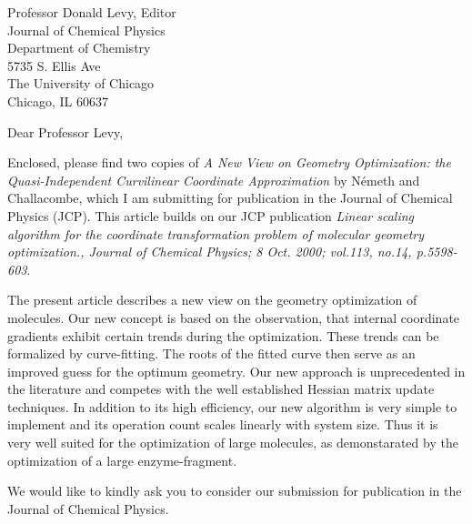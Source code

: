 
\pagestyle{empty}

\signature{K{\'a}roly N{\'e}meth}

\address{
Dr.~K{\'a}roly N{\'e}meth \\
(knemeth@lanl.gov) \\
Theoretical Division \\
Group T-12, MS B268 \\
Los Alamos National Laboratory \\
Los Alamos, NM 87545 }

\begin{letter}{
Professor Donald Levy, Editor\\
Journal of Chemical Physics\\
Department of Chemistry\\
5735 S. Ellis Ave\\
The University of Chicago\\
Chicago, IL 60637}

\opening{Dear Professor Levy,}

Enclosed, please find two copies of 
{\em 
A New View on Geometry Optimization: the Quasi-Independent 
Curvilinear Coordinate Approximation
} by N{\'e}meth and Challacombe,
which I am submitting for publication in the Journal of Chemical Physics (JCP). This 
article builds 
on our JCP publication {\em Linear scaling algorithm for the coordinate transformation problem of molecular geometry optimization., 
Journal of Chemical Physics; 8 Oct. 2000; vol.113, no.14, p.5598-603}.

The present article describes a new view on the geometry optimization
of molecules. Our new concept is based on the observation, that
internal coordinate gradients exhibit certain trends during the 
optimization. These trends can be formalized by curve-fitting. 
The roots of the fitted curve then serve as an improved guess
for the optimum geometry. Our new approach is unprecedented in the 
literature and competes with the well established Hessian matrix update
techniques. In addition to its high efficiency, our new
algorithm is very simple to implement and its operation count scales
linearly with system size. Thus it is very well suited for the
optimization of large molecules, as demonstarated by
the optimization of a large enzyme-fragment.

We would like to kindly ask you to consider our 
submission for publication in the Journal of Chemical Physics.


\end{letter}
